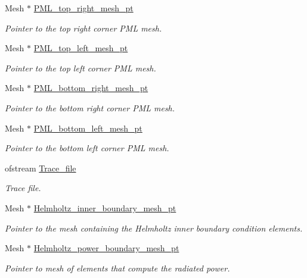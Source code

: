 \begin{DoxyCompactItemize}
Mesh $\ast$ \hyperlink{classPMLProblem_aa0676946d6e64d7f8eb6174bc12f3b79}{P\+M\+L\+\_\+top\+\_\+right\+\_\+mesh\+\_\+pt}
\begin{DoxyCompactList}\small\item\em Pointer to the top right corner P\+ML mesh. \end{DoxyCompactList}\item 
Mesh $\ast$ \hyperlink{classPMLProblem_aa74e9cdaa9f7d63cd6cd0770e30e2cbe}{P\+M\+L\+\_\+top\+\_\+left\+\_\+mesh\+\_\+pt}
\begin{DoxyCompactList}\small\item\em Pointer to the top left corner P\+ML mesh. \end{DoxyCompactList}\item 
Mesh $\ast$ \hyperlink{classPMLProblem_a51dccc650129c0afd903b4c359a4e6dd}{P\+M\+L\+\_\+bottom\+\_\+right\+\_\+mesh\+\_\+pt}
\begin{DoxyCompactList}\small\item\em Pointer to the bottom right corner P\+ML mesh. \end{DoxyCompactList}\item 
Mesh $\ast$ \hyperlink{classPMLProblem_a0d32b04ee51f2a9e5e14183b212e7815}{P\+M\+L\+\_\+bottom\+\_\+left\+\_\+mesh\+\_\+pt}
\begin{DoxyCompactList}\small\item\em Pointer to the bottom left corner P\+ML mesh. \end{DoxyCompactList}\item 
ofstream \hyperlink{classPMLProblem_a6b343355ccace2851da1860dea7d6a3b}{Trace\+\_\+file}
\begin{DoxyCompactList}\small\item\em Trace file. \end{DoxyCompactList}\item 
Mesh $\ast$ \hyperlink{classPMLProblem_a7aeca36fdbe76a52bb68808f2d4547f2}{Helmholtz\+\_\+inner\+\_\+boundary\+\_\+mesh\+\_\+pt}
\begin{DoxyCompactList}\small\item\em Pointer to the mesh containing the Helmholtz inner boundary condition elements. \end{DoxyCompactList}\item 
Mesh $\ast$ \hyperlink{classPMLProblem_abf7ac369650cc7a876479a208752e02c}{Helmholtz\+\_\+power\+\_\+boundary\+\_\+mesh\+\_\+pt}
\begin{DoxyCompactList}\small\item\em Pointer to mesh of elements that compute the radiated power. \end{DoxyCompactList}\end{DoxyCompactItemize}


